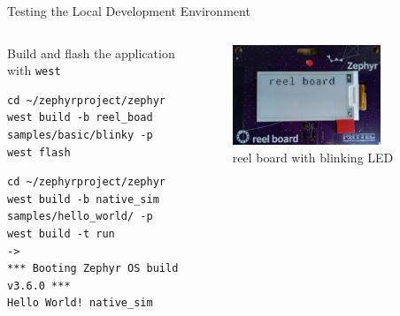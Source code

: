 \documentclass[10pt, aspectratio=169]{beamer}
\begin{document}
\begin{frame}[fragile]{Testing the Local Development Environment}
  \begin{columns}
    \begin{column}{0.6\textwidth}
    Build and flash the application with \texttt{west}
    \begin{verbatim}
cd ~/zephyrproject/zephyr
west build -b reel_boad samples/basic/blinky -p
west flash
    \end{verbatim}
    \begin{verbatim}
cd ~/zephyrproject/zephyr
west build -b native_sim samples/hello_world/ -p
west build -t run
->
*** Booting Zephyr OS build v3.6.0 ***
Hello World! native_sim
    \end{verbatim}
    \end{column}
    \begin{column}{0.4\textwidth}
      \begin{figure}
        \includegraphics[width=0.8\textwidth]{images/zephyr_blinky.png}
        \caption*{reel board with blinking LED}
      \end{figure}
    \end{column}
  \end{columns}
\end{frame}
\end{document}
